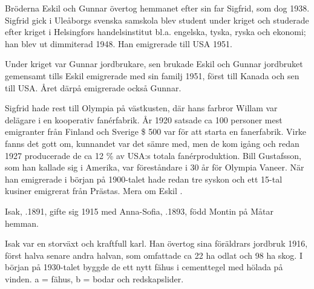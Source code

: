 Bröderna Eskil och Gunnar övertog hemmanet efter sin far Sigfrid, som dog 1938. Sigfrid gick i Uleåborgs svenska samskola blev student under kriget och studerade efter kriget i Helsingfors handelsinstitut bl.a. engelska, tyska, ryska och ekonomi; han blev ut dimmiterad 1948. Han emigrerade till USA 1951.

Under kriget var Gunnar jordbrukare, sen brukade Eskil och Gunnar jordbruket gemensamt tills Eskil emigrerade med sin familj 1951, först till Kanada och sen till USA. Året därpå emigrerade också Gunnar.

Sigfrid hade rest till Olympia på västkusten, där hans farbror Willam var delägare i en kooperativ fanérfabrik. År 1920 satsade ca 100 personer mest emigranter från Finland och Sverige \$ 500 var för att starta en fanerfabrik. Virke fanns det gott om, kunnandet var det sämre med, men de kom igång och redan 1927 producerade de ca 12 \% av USA:s totala fanérproduktion. Bill Gustafsson, som han kallade sig i Amerika, var föreståndare i 30 år för Olympia Vaneer. När han emigrerade i början på 1900-talet hade redan tre syskon och ett 15-tal kusiner emigrerat från Prästas. Mera om Eskil .


Isak, .1891, gifte sig 1915 med Anna-Sofia, .1893, född Montin på Måtar hemman.
\begin{jhchildren}
  \item {}
  \item {}
  \item {}
  \item {}
  \item {}
  \item {}
\end{jhchildren}
Isak var en storväxt och kraftfull karl. Han övertog sina föräldrars jordbruk 1916, först halva senare andra halvan, som omfattade ca 22 ha odlat och 98 ha skog. I början på 1930-talet byggde de ett nytt fähus i cementtegel med hölada på vinden. a = fähus, b = bodar och redskapslider.

